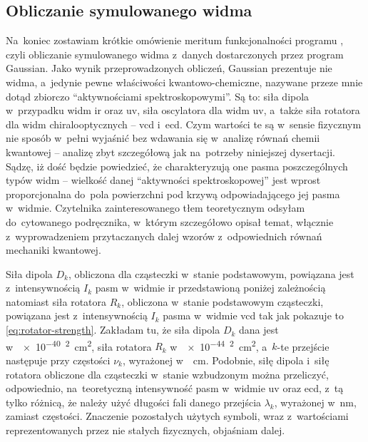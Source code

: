 \subsection{Obliczanie symulowanego widma}\label{implementation:spectra}
Na~koniec zostawiam krótkie omówienie meritum funkcjonalności programu \tesliper{},
  czyli obliczanie symulowanego widma z~danych dostarczonych przez program Gaussian.
Jako wynik przeprowadzonych obliczeń, Gaussian prezentuje nie widma, a~jedynie pewne właściwości
  kwantowo-chemiczne, nazywane przeze mnie dotąd zbiorczo \enquote{aktywnościami spektroskopowymi}.
Są to: siła dipola w~przypadku widm \gls{ir} oraz \gls{uv}, siła oscylatora dla widm \gls{uv},
  a~także siła rotatora dla widm chiralooptycznych \--- \gls{vcd} i~\gls{ecd}.
Czym wartości te są w~sensie fizycznym nie sposób w~pełni wyjaśnić bez wdawania się w~analizę
  równań chemii kwantowej \--- analizę zbyt szczegółową jak na~potrzeby niniejszej dysertacji.
Sądzę, iż dość będzie powiedzieć, że charakteryzują one pasma poszczególnych typów widm \---
  wielkość danej \enquote{aktywności spektroskopowej} jest wprost proporcjonalna do~pola
  powierzchni pod krzywą odpowiadającego jej pasma w~widmie.
Czytelnika zainteresowanego tłem teoretycznym odsyłam do~cytowanego podręcznika,
  w~którym \citeauthor{polavarapu17} szczegółowo opisał temat, włącznie z~wyprowadzeniem
  przytaczanych dalej wzorów z~odpowiednich równań mechaniki kwantowej.

Siła dipola $D_k$, obliczona dla cząsteczki w~stanie podstawowym, powiązana jest
  z~intensywnością $I_k$ pasm w~widmie \gls{ir} przedstawioną poniżej zależnością
   natomiast siła rotatora $R_k$, obliczona w~stanie podstawowym
  cząsteczki, powiązana jest z~intensywnością $I_k$ pasma w~widmie \gls{vcd} tak jak
  pokazuje to \cref{eq:rotator-strength}.
Zakładam tu, że siła dipola $D_k$ dana jest w~\SI{e-40}{\esu\squared\centi\meter\squared},
  siła rotatora $R_k$ w~\SI{e-44}{\esu\squared\centi\meter\squared}, a~$k$-te przejście
  następuje przy częstości $\nu_k$, wyrażonej w~\si{\per\centi\meter}.
Podobnie, siłę dipola i~siłę rotatora obliczone dla cząsteczki w~stanie wzbudzonym można
  przeliczyć, odpowiednio, na~teoretyczną intensywność pasm w~widmie \gls{uv} oraz \gls{ecd},
  z~tą tylko różnicą, że należy użyć długości fali danego przejścia $\lambda_k$, wyrażonej
  w~\si{\nano\meter}, zamiast częstości.
Znaczenie pozostałych użytych symboli, wraz z~wartościami reprezentowanych przez nie
  stałych fizycznych, objaśniam dalej.

